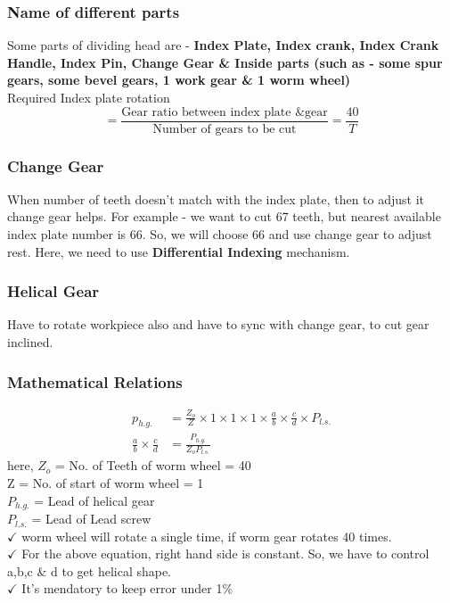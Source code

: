 \documentclass{article}
\begin{document}
\begin{multicols}{2}
\subsubsection*{Name of different parts}
Some parts of dividing head are - 
\textbf{Index Plate, Index crank, Index Crank Handle, Index Pin, Change Gear \& Inside parts (such as - some spur gears, some bevel gears, 1 work gear \& 1 worm wheel)}\\

Required Index plate rotation
\[
= \frac{\text{Gear ratio between index plate \& gear}}{\text{Number of gears to be cut}}=\frac{40}{T}
\]

\subsubsection*{Change Gear}
When number of teeth doesn't match with the index plate, then to adjust it change gear helps. For example - we want to cut 67 teeth, but nearest available index plate number is 66. So, we will choose 66 and use change gear to adjust rest. Here, we need to use \textbf{Differential Indexing} mechanism. 

\subsubsection*{Helical Gear}
Have to rotate workpiece also and have to sync with change gear, to cut gear inclined. 

\subsubsection*{Mathematical Relations}
\begin{align*}
  p_{h.g.} &= \frac{Z_o}{Z} \times 1 \times 1 \times 1 \times \frac{a}{b} \times \frac{c}{d} \times P_{l.s.}\\
  \frac{a}{b} \times \frac{c}{d} &= \frac{P_{h.g.}}{Z_o P_{l.s.}} 
\end{align*}
here, $Z_o$ = No. of Teeth of worm wheel = 40 \\
Z = No. of start of worm wheel = 1 \\ 
$P_{h.g.}$ = Lead of helical gear \\
$P_{l.s.}$ = Lead of Lead screw \\
$\checkmark$ worm wheel will rotate a single time, if worm gear rotates 40 times. \\
$\checkmark$ For the above equation, right hand side is constant. So, we have to control a,b,c \& d to get helical shape.  \\
$\checkmark$ It's mendatory to keep error under 1\%  


\end{multicols}
\end{document}
